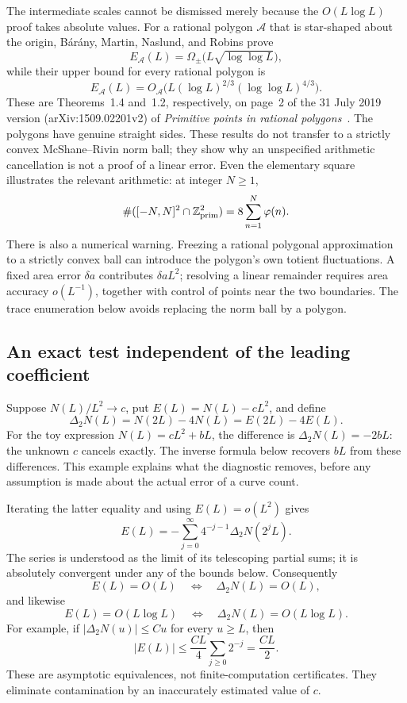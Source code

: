 The intermediate scales cannot be dismissed merely because the
$O(L\log L)$ proof takes absolute values. For a rational polygon
$\mathcal A$ that is star-shaped about the origin, B\'ar\'any,
Martin, Naslund, and Robins prove
\[
 E_{\mathcal A}(L)
 =\Omega_\pm\bigl(L\sqrt{\log\log L}\bigr),
\]
while their upper bound for every rational polygon is
\[
 E_{\mathcal A}(L)
 =O_{\mathcal A}\bigl(L(\log L)^{2/3}
                         (\log\log L)^{4/3}\bigr).
\]
These are Theorems~1.4 and~1.2, respectively, on page~2 of the
31 July 2019 version (arXiv:1509.02201v2) of
\emph{Primitive points in rational polygons}~\cite{BaranyPrimitivePolygons}.
The polygons have genuine straight sides. These results do not
transfer to a strictly convex McShane--Rivin norm ball; they show
why an unspecified arithmetic cancellation is not a proof of a
linear error. Even the elementary square illustrates the relevant
arithmetic: at integer $N\ge1$,
\[
 \#([-N,N]^2\cap\mathbb Z^2_{\rm prim})
 =8\sum_{n=1}^N\varphi(n).
\]
There is also a numerical warning. Freezing a rational polygonal
approximation to a strictly convex ball can introduce the polygon's own
totient fluctuations. A fixed area error $\delta a$ contributes
$\delta a L^2$; resolving a linear remainder requires area accuracy
$o(L^{-1})$, together with control of points near the two boundaries.
The trace enumeration below avoids replacing the norm ball by a polygon.

\subsection{An exact test independent of the leading coefficient}
\label{subsec:dyadicdiagnostic}

Suppose $N(L)/L^2\to c$, put $E(L)=N(L)-cL^2$, and define
\[
 \Delta_2N(L)=N(2L)-4N(L)=E(2L)-4E(L).
\]
For the toy expression $N(L)=cL^2+bL$, the difference is
$\Delta_2N(L)=-2bL$: the unknown $c$ cancels exactly.
The inverse formula below recovers $bL$ from these differences.
This example explains what the diagnostic removes, before any
assumption is made about the actual error of a curve count.

Iterating the latter equality and using $E(L)=o(L^2)$ gives
\begin{equation}
 E(L)=-\sum_{j=0}^\infty4^{-j-1}\Delta_2N(2^jL).
 \label{eq:dyadicerrorinverse}
\end{equation}
The series is understood as the limit of its telescoping partial
sums; it is absolutely convergent under any of the bounds below.
Consequently
\[
 E(L)=O(L)\quad\Longleftrightarrow\quad
 \Delta_2N(L)=O(L),
\]
and likewise
\[
 E(L)=O(L\log L)\quad\Longleftrightarrow\quad
 \Delta_2N(L)=O(L\log L).
\]
For example, if $|\Delta_2N(u)|\le Cu$ for every $u\ge L$, then
\[
 |E(L)|\le\frac{CL}{4}\sum_{j\ge0}2^{-j}=\frac{CL}{2}.
\]
These are asymptotic equivalences, not finite-computation certificates.
They eliminate contamination by an inaccurately estimated value of $c$.

